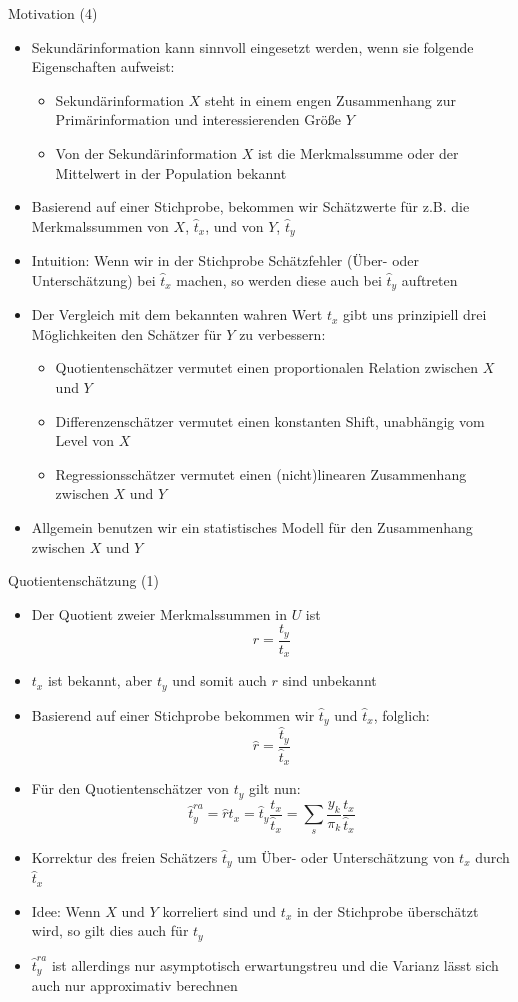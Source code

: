 \documentclass[9pt]{beamer}
\begin{document}
\begin{frame}{Motivation (4)}
\begin{itemize}
	\item Sekundärinformation kann sinnvoll eingesetzt werden, wenn sie folgende Eigenschaften aufweist:
	\begin{itemize}
		\item Sekundärinformation $X$ steht in einem engen Zusammenhang zur Primärinformation und interessierenden Größe $Y$
		\item Von der Sekundärinformation $X$ ist die Merkmalssumme oder der Mittelwert in der Population bekannt
	\end{itemize}
	\item Basierend auf einer Stichprobe, bekommen wir Schätzwerte für z.B. die Merkmalssummen von $X$, $\hat{t}_x$, und von $Y$, $\hat{t}_y$
	\item Intuition: Wenn wir in der Stichprobe Schätzfehler (Über- oder Unterschätzung) bei $\hat{t}_x$ machen, so werden diese auch bei $\hat{t}_y$ auftreten
	\item Der Vergleich mit dem bekannten wahren Wert $t_x$ gibt uns prinzipiell drei Möglichkeiten den Schätzer für $Y$ zu verbessern:
	\begin{itemize}
		\item Quotientenschätzer vermutet einen proportionalen Relation zwischen $X$ und $Y$
		\item Differenzenschätzer vermutet einen konstanten Shift, unabhängig vom Level von $X$
		\item Regressionsschätzer vermutet einen (nicht)linearen Zusammenhang zwischen $X$ und $Y$
	\end{itemize}
	\item Allgemein benutzen wir ein statistisches Modell für den Zusammenhang zwischen $X$ und $Y$
\end{itemize}
\end{frame}

\begin{frame}{Quotientenschätzung (1)}
\begin{itemize}
	\item Der Quotient zweier Merkmalssummen in $U$ ist
	$$ r= \frac{t_y}{t_x}$$
	\item $t_x$ ist bekannt, aber $t_y$ und somit auch $r$ sind unbekannt
	\item Basierend auf einer Stichprobe bekommen wir $\hat{t}_y$ und $\hat{t}_x$, folglich: 	$$ \hat{r}= \frac{\hat{t}_y}{\hat{t}_x}$$
	\item Für den Quotientenschätzer von $t_y$ gilt nun:
	$$\hat{t}_{y}^{ra} = \hat{r} t_x = \hat{t}_y \frac{t_x}{\hat{t}_x} = \sum_s \frac{y_k}{\pi_k}\frac{t_x}{\hat{t}_x}$$
	\item Korrektur des freien Schätzers $\hat{t}_y$ um Über- oder Unterschätzung von $t_x$ durch $\hat{t}_x$
	\item Idee: Wenn $X$ und $Y$ korreliert sind und $t_x$ in der Stichprobe überschätzt wird, so gilt dies auch für $t_y$
	\item $\hat{t}_{y}^{ra}$ ist allerdings nur asymptotisch erwartungstreu und die Varianz lässt sich auch nur approximativ berechnen
\end{itemize}
\end{frame}
\end{document}
